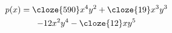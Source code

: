 \documentclass{article}
\begin{document}
{}

\def\clozefont{}

\begin{multline*}
p(x) = \cloze{590}x^4y^2 + \cloze{19}x^3y^3\\
- 12x^2y^4 - \cloze{12}xy^5
\end{multline*}
\end{document}

